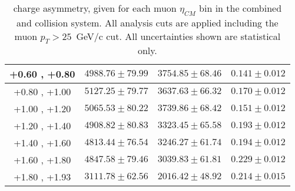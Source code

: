 \begin{table}[h!]
\begin{tabular}{|c|*3c|}
    \hline
    +0.60 , +0.80 & $4988.76 \pm 79.99$ & $3754.85 \pm 68.46$ & $0.141 \pm 0.012$\\
    \hline
    +0.80 , +1.00 & $5127.25 \pm 79.77$ & $3637.63 \pm 66.32$ & $0.170 \pm 0.012$\\
    \hline
    +1.00 , +1.20 & $5065.53 \pm 80.22$ & $3739.86 \pm 68.42$ & $0.151 \pm 0.012$\\
    \hline
    +1.20 , +1.40 & $4908.82 \pm 80.83$ & $3323.45 \pm 65.58$ & $0.193 \pm 0.012$\\
    \hline
    +1.40 , +1.60 & $4813.44 \pm 76.54$ & $3246.27 \pm 61.74$ & $0.194 \pm 0.012$\\
    \hline
    +1.60 , +1.80 & $4847.58 \pm 79.46$ & $3039.83 \pm 61.81$ & $0.229 \pm 0.012$\\
    \hline
    +1.80 , +1.93 & $3111.78 \pm 62.56$ & $2016.42 \pm 48.92$ & $0.214 \pm 0.015$\\
    \hline
  \end{tabular}
  \caption{\W charge asymmetry, given for each muon $\eta_{CM}$ bin in the combined \pPb and \Pbp collision system. All analysis cuts are applied including the muon $p_{T} > 25$~GeV/c cut. All uncertainties shown are statistical only.}
  \label{tab:ChargeAsymmetry_WToMu_PA}
\end{table}


